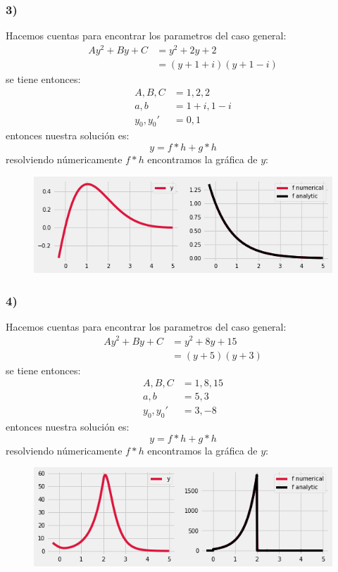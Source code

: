 \documentclass{article}
\begin{document}
\begin{tcolorbox}
    \subsubsection*{3)}
    Hacemos cuentas para encontrar los parametros del caso general:
    \begin{align*}
        Ay^2 + By + C 
        &= y^2 + 2y + 2 \\
        &= (y+1+i)(y+1-i)
    \end{align*}
    se tiene entonces:
    \begin{align*}
        A, B, C &= 1, 2, 2 \\ 
        a,b &= 1+i, 1-i \\  
        y_0, y_0' &= 0,1
    \end{align*}    
    entonces nuestra solución es:
    \[ y = f*h + g*h \]
    resolviendo númericamente $f*h$ encontramos la gráfica de $y$:
    \begin{figure}[H]
        \centering
        \includegraphics[scale=0.7]{images/p1_3.png}
    \end{figure}

    \subsubsection*{4)}
    Hacemos cuentas para encontrar los parametros del caso general:
    \begin{align*}
        Ay^2 + By + C 
        &= y^2 + 8y + 15 \\
        &= (y+5)(y+3)
    \end{align*}
    se tiene entonces:
    \begin{align*}
        A, B, C &= 1,8,15 \\
        a,b &= 5,3 \\ 
        y_0, y_0' &= 3,-8
    \end{align*}
    entonces nuestra solución es:
    \[ y = f*h + g*h \]
    resolviendo númericamente $f*h$ encontramos la gráfica de $y$:
    \begin{figure}[H]
        \centering
        \includegraphics[scale=0.7]{images/p1_4.png}
    \end{figure}

\end{tcolorbox}
\end{document}

